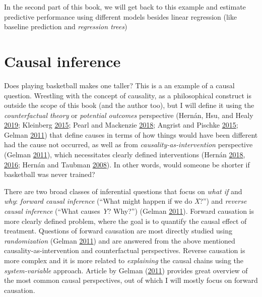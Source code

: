 \documentclass[
]{book}
\begin{document}
In the second part of this book, we will get back to this example and estimate predictive performance using different models besides linear regression (like baseline prediction and \emph{regression trees})

\hypertarget{causal-inference}{%
\chapter{Causal inference}\label{causal-inference}}

Does playing basketball makes one taller? This is a an example of a causal question. Wrestling with the concept of causality, as a philosophical construct is outside the scope of this book (and the author too), but I will define it using the \emph{counterfactual theory} or \emph{potential outcomes} perspective (Hernán, Hsu, and Healy \protect\hyperlink{ref-hernanSecondChanceGet2019}{2019}; Kleinberg \protect\hyperlink{ref-kleinbergWhyGuideFinding2015}{2015}; Pearl and Mackenzie \protect\hyperlink{ref-pearlBookWhyNew2018}{2018}; Angrist and Pischke \protect\hyperlink{ref-angristMasteringMetricsPath2015}{2015}; Gelman \protect\hyperlink{ref-gelmanCausalityStatisticalLearning2011}{2011}) that define causes in terms of how things would have been different had the cause not occurred, as well as from \emph{causality-as-intervention} perspective (Gelman \protect\hyperlink{ref-gelmanCausalityStatisticalLearning2011}{2011}), which necessitates clearly defined interventions (Hernán \protect\hyperlink{ref-hernanCWordScientificEuphemisms2018}{2018}, \protect\hyperlink{ref-hernanDoesWaterKill2016}{2016}; Hernán and Taubman \protect\hyperlink{ref-hernanDoesObesityShorten2008}{2008}). In other words, would someone be shorter if basketball was never trained?

There are two broad classes of inferential questions that focus on \emph{what if} and \emph{why}: \emph{forward causal inference} (``What might happen if we do \emph{X}?'') and \emph{reverse causal inference} (``What causes \emph{Y}? Why?'') (Gelman \protect\hyperlink{ref-gelmanCausalityStatisticalLearning2011}{2011}). Forward causation is more clearly defined problem, where the goal is to quantify the causal effect of treatment. Questions of forward causation are most directly studied using \emph{randomization} (Gelman \protect\hyperlink{ref-gelmanCausalityStatisticalLearning2011}{2011}) and are answered from the above mentioned causality-as-intervention and counterfactual perspectives. Reverse causation is more complex and it is more related to \emph{explaining} the causal chains using the \emph{system-variable} approach. Article by Gelman (\protect\hyperlink{ref-gelmanCausalityStatisticalLearning2011}{2011}) provides great overview of the most common causal perspectives, out of which I will mostly focus on forward causation.
\end{document}

